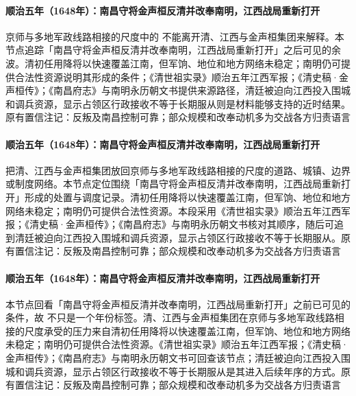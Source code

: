 \paragraph{顺治五年（1648年）：南昌守将金声桓反清并改奉南明，江西战局重新打开}
京师与多地军政线路相接的尺度中的 不能离开清、江西与金声桓集团来解释。本节点追踪「南昌守将金声桓反清并改奉南明，江西战局重新打开」之后可见的余波。清初任用降将以快速覆盖江南，但军饷、地位和地方网络未稳定；南明仍可提供合法性资源说明其形成的条件；《清世祖实录》顺治五年江西军报；《清史稿·金声桓传》；《南昌府志》与南明永历朝文书提供来源路径，清廷被迫向江西投入围城和调兵资源，显示占领区行政接收不等于长期服从则是材料能够支持的近时结果。原有置信注记：反叛及南昌控制可靠；部众规模和改奉动机多为交战各方归责语言

\paragraph{顺治五年（1648年）：南昌守将金声桓反清并改奉南明，江西战局重新打开}
 把清、江西与金声桓集团放回京师与多地军政线路相接的尺度的道路、城镇、边界或制度网络。本节点定位围绕「南昌守将金声桓反清并改奉南明，江西战局重新打开」形成的处置与调度记录。清初任用降将以快速覆盖江南，但军饷、地位和地方网络未稳定；南明仍可提供合法性资源。本段采用《清世祖实录》顺治五年江西军报；《清史稿·金声桓传》；《南昌府志》与南明永历朝文书核对其顺序，随后可追到清廷被迫向江西投入围城和调兵资源，显示占领区行政接收不等于长期服从。原有置信注记：反叛及南昌控制可靠；部众规模和改奉动机多为交战各方归责语言

\paragraph{顺治五年（1648年）：南昌守将金声桓反清并改奉南明，江西战局重新打开}
本节点回看「南昌守将金声桓反清并改奉南明，江西战局重新打开」之前已可见的条件，故 不只是一个年份标签。清、江西与金声桓集团在京师与多地军政线路相接的尺度承受的压力来自清初任用降将以快速覆盖江南，但军饷、地位和地方网络未稳定；南明仍可提供合法性资源。《清世祖实录》顺治五年江西军报；《清史稿·金声桓传》；《南昌府志》与南明永历朝文书可回查该节点；清廷被迫向江西投入围城和调兵资源，显示占领区行政接收不等于长期服从是其进入后续年序的方式。原有置信注记：反叛及南昌控制可靠；部众规模和改奉动机多为交战各方归责语言

